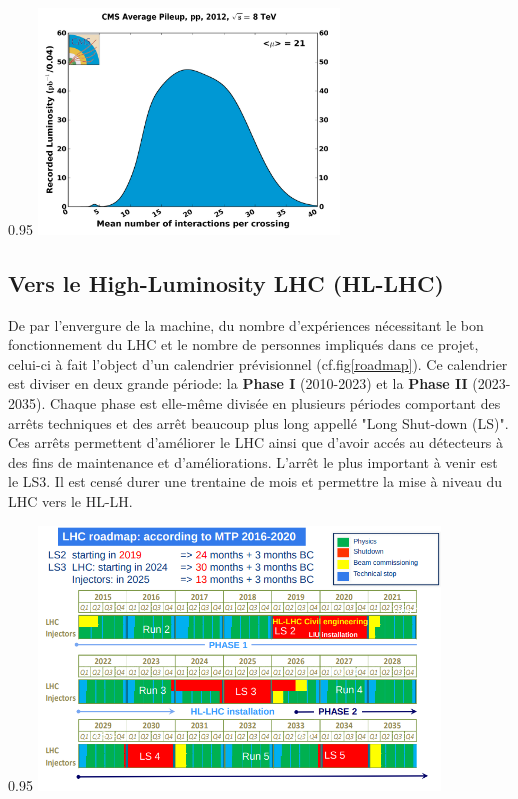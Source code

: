 \begin{minipagewithmarginpars}[h]{0.95\textwidth}
	\centering
	\includegraphics[width=0.60\textwidth]{LHC/pileup.png}
	\label{pile-up}	
\end{minipagewithmarginpars}

\subsection{Vers le High-Luminosity LHC (HL-LHC)}
De par l'envergure de la machine, du nombre d'expériences nécessitant le bon fonctionnement du LHC et le nombre de personnes impliqués dans ce projet, celui-ci à fait l'object d'un calendrier prévisionnel (cf.fig\ref{roadmap}). Ce calendrier est diviser en deux grande période: la \textbf{Phase I} (2010-2023) et la  \textbf{Phase II} (2023-2035). Chaque phase est elle-même divisée en plusieurs périodes comportant des arrêts techniques et des arrêt beaucoup plus long appellé "Long Shut-down (LS)". Ces arrêts permettent d'améliorer le LHC ainsi que d'avoir accés au détecteurs à des fins de maintenance et d'améliorations. L'arrêt le plus important à venir est le LS3. Il est censé durer une trentaine de mois et permettre la mise à niveau du LHC vers le HL-LH.

\begin{minipagewithmarginpars}[h]{0.95\textwidth}
	\centering
	\includegraphics[width=0.80\textwidth]{LHC/roadmap.png}
	\label{roadmap}	
\end{minipagewithmarginpars}


